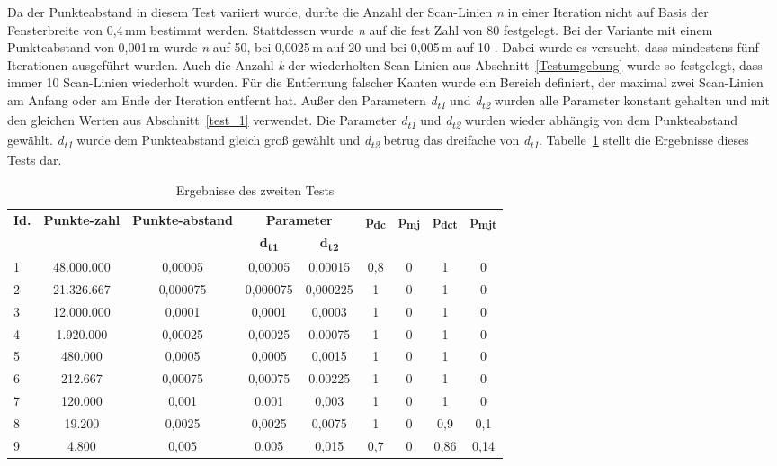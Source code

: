 Da der Punkteabstand in diesem Test variiert wurde, durfte die Anzahl der Scan-Linien \textit{n} in einer Iteration nicht auf Basis der Fensterbreite von 0,4\,\si{\mm} bestimmt werden. Stattdessen wurde \textit{n} auf die fest Zahl von 80 festgelegt. Bei der Variante mit einem Punkteabstand von 0,001\,\si{\m} wurde \textit{n} auf 50, bei 0,0025\,\si{\m} auf 20 und bei 0,005\,\si{\m} auf 10 . Dabei wurde es versucht, dass mindestens fünf Iterationen ausgeführt wurden. Auch die Anzahl \textit{k} der wiederholten Scan-Linien aus Abschnitt~\ref{Testumgebung} wurde so festgelegt, dass immer 10 Scan-Linien wiederholt wurden. Für die Entfernung falscher Kanten wurde ein Bereich definiert, der maximal zwei Scan-Linien am Anfang oder am Ende der Iteration entfernt hat. Außer den Parametern \textit{d\textsubscript{t1}} und \textit{d\textsubscript{t2}} wurden alle Parameter konstant gehalten und mit den gleichen Werten aus Abschnitt~\ref{test_1} verwendet. Die Parameter \textit{d\textsubscript{t1}} und \textit{d\textsubscript{t2}} wurden wieder abhängig von dem Punkteabstand gewählt. \textit{d\textsubscript{t1}} wurde dem Punkteabstand gleich groß gewählt und \textit{d\textsubscript{t2}} betrug das dreifache von \textit{d\textsubscript{t1}}. Tabelle~\ref{table: test_2_results} stellt die Ergebnisse dieses Tests dar.

\begin{table}[b]
	\centering
	\begin{tabular}[width = \textwidth]{l *{8}{c}}
		\hline
		\multirow{2}{2em}{\textbf{Id.}} & \multirow{2}{3em}{\textbf{Punkte-zahl}} & \multirow{2}{3em}{\textbf{Punkte-abstand}} & \multicolumn{2}{c}{\textbf{Parameter}} & \multirow{2}{*}{\textbf{p\textsubscript{dc}}} & \multirow{2}{*}{\textbf{p\textsubscript{mj}}} & \multirow{2}{*}{\textbf{p\textsubscript{dct}}} & \multirow{2}{*}{\textbf{p\textsubscript{mjt}}} \\
		& & & \textbf{d\textsubscript{t1}} &\textbf{d\textsubscript{t2}} & & & & \\
		\hline
		1 & 48.000.000 & 0,00005 & 0,00005 & 0,00015 & 0,8 & 0 & 1 & 0 \\
		2 & 21.326.667 & 0,000075 & 0,000075 & 0,000225 & 1 & 0 & 1 & 0 \\
		3 & 12.000.000 & 0,0001 & 0,0001 & 0,0003 & 1 & 0 & 1 & 0 \\
		4 & 1.920.000 & 0,00025 & 0,00025 & 0,00075 & 1 & 0 & 1 & 0 \\
		5 & 480.000 & 0,0005 & 0,0005 & 0,0015 & 1 & 0 & 1 & 0 \\
		6 & 212.667 & 0,00075 & 0,00075 & 0,00225 & 1 & 0 & 1 & 0 \\
		7 & 120.000 & 0,001	& 0,001 & 0,003 & 1 & 0 & 1 & 0 \\
		8 & 19.200 & 0,0025 & 0,0025 & 0,0075 & 1 & 0 & 0,9 & 0,1 \\
		9 & 4.800 & 0,005 & 0,005 & 0,015 & 0,7 & 0 & 0,86 & 0,14 \\
		\hline 
	\end{tabular}
	\caption{Ergebnisse des zweiten Tests}
	\label{table: test_2_results}
\end{table}

